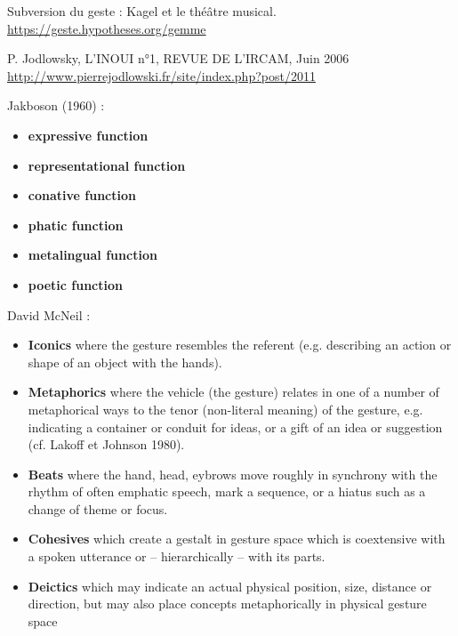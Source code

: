 Subversion du geste : Kagel et le théâtre musical.
\url{https://geste.hypotheses.org/gemme}



P. Jodlowsky, L'INOUI n°1, REVUE DE L'IRCAM, Juin 2006
\url{http://www.pierrejodlowski.fr/site/index.php?post/2011}



\noindent Jakboson (1960) :
\vspace{-1em}
\begin{itemize}[noitemsep]
\item \textbf{expressive function}
\item \textbf{representational function}
\item \textbf{conative function}
\item \textbf{phatic function}
\item \textbf{metalingual function}
\item \textbf{poetic function}
\end{itemize}

\noindent David McNeil : 
\vspace{-1em}
\begin{itemize}[noitemsep]
\item \textbf{Iconics} where the gesture resembles the referent (e.g. describing an action or shape of an object with the hands).
\item \textbf{Metaphorics} where the vehicle (the gesture) relates in one of a number of metaphorical ways to the tenor (non-literal meaning) of the gesture, e.g. indicating a container or conduit for ideas, or a gift of an idea or suggestion (cf. Lakoff et Johnson 1980).
\item \textbf{Beats} where the hand, head, eybrows move roughly in synchrony with the rhythm of often emphatic speech, mark a sequence, or a hiatus such as a change of theme or focus.
\item \textbf{Cohesives} which create a gestalt in gesture space which is coextensive with a spoken utterance or – hierarchically – with its parts.
\item \textbf{Deictics} which may indicate an actual physical position, size, distance or direction, but may also place concepts metaphorically in physical gesture space
\end{itemize}


